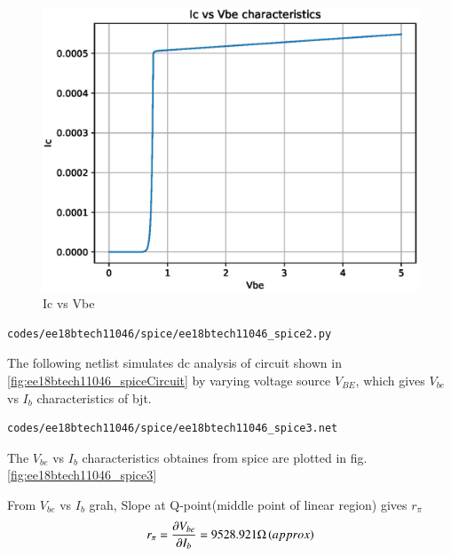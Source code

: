 \begin{enumerate}[label=\arabic*.,ref=\theenumi]
%
\begin{figure}[!ht]
\centering
\includegraphics[width=\columnwidth]{./figs/ee18btech11046/ee18btech11046_2.eps}
\caption{Ic vs Vbe}
\label{fig:ee18btech11046_spice2}
\end{figure}
%

\begin{lstlisting}
codes/ee18btech11046/spice/ee18btech11046_spice2.py
\end{lstlisting}

The following netlist simulates dc analysis of circuit shown in \ref{fig:ee18btech11046_spiceCircuit} by varying voltage source $V_{BE}$, which gives $V_{be}$ vs $I_{b}$ characteristics of bjt.
\begin{lstlisting}
codes/ee18btech11046/spice/ee18btech11046_spice3.net
\end{lstlisting}


The $V_{be}$ vs $I_{b}$ characteristics obtaines from spice are plotted in  fig.\ref{fig:ee18btech11046_spice3}

From $V_{be}$ vs $I_{b}$ grah, Slope at Q-point(middle point of linear region) gives $r_{\pi}$
\begin{align}
r_{\pi} = \frac{\partial V_{be}}{\partial I_{b}} = 9528.921\ohm \left(approx\right)
\end{align}


\end{enumerate}
